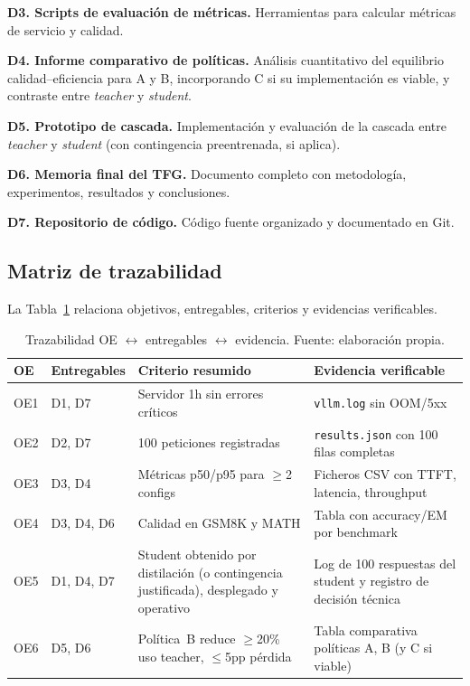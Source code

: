\documentclass[11pt,a4paper]{article}
\begin{document}
\textbf{D3. Scripts de evaluación de métricas.} Herramientas para calcular métricas de servicio y calidad.

\textbf{D4. Informe comparativo de políticas.} Análisis cuantitativo del equilibrio calidad--eficiencia para A y B, incorporando C si su implementación es viable, y contraste entre \textit{teacher} y \textit{student}.

\textbf{D5. Prototipo de cascada.} Implementación y evaluación de la cascada entre \textit{teacher} y \textit{student} (con contingencia preentrenada, si aplica).

\textbf{D6. Memoria final del TFG.} Documento completo con metodología, experimentos, resultados y conclusiones.

\textbf{D7. Repositorio de código.} Código fuente organizado y documentado en Git.

\subsection{Matriz de trazabilidad}

La Tabla~\ref{tab:trace} relaciona objetivos, entregables, criterios y evidencias verificables.

\begin{table}[H]
\centering
\caption{Trazabilidad OE $\leftrightarrow$ entregables $\leftrightarrow$ evidencia. Fuente: elaboración propia.}
\label{tab:trace}
\footnotesize
\setlength{\tabcolsep}{3pt}
\begin{tabularx}{\textwidth}{>{\raggedright\arraybackslash}p{0.8cm} >{\raggedright\arraybackslash}p{1.8cm} X >{\raggedright\arraybackslash}p{3.8cm}}
\toprule
\textbf{OE} & \textbf{Entregables} & \textbf{Criterio resumido} & \textbf{Evidencia verificable} \\
\midrule
OE1 & D1, D7 & Servidor 1h sin errores críticos & \texttt{vllm.log} sin OOM/5xx \\
OE2 & D2, D7 & 100 peticiones registradas & \texttt{results.json} con 100 filas completas \\
OE3 & D3, D4 & Métricas p50/p95 para $\geq$2 configs & Ficheros CSV con TTFT, latencia, throughput \\
OE4 & D3, D4, D6 & Calidad en GSM8K y MATH & Tabla con accuracy/EM por benchmark \\
OE5 & D1, D4, D7 & Student obtenido por distilación (o contingencia justificada), desplegado y operativo & Log de 100 respuestas del student y registro de decisión técnica \\
OE6 & D5, D6 & Política~B reduce $\geq$20\% uso teacher, $\leq$5pp pérdida & Tabla comparativa políticas A, B (y C si viable) \\
\bottomrule
\end{tabularx}
\end{table}
\end{document}
